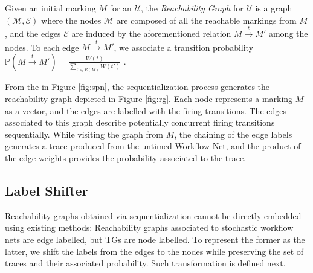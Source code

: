 \begin{definition}
	Given an initial marking $M$ for an \uswn $\mathcal{U}$,  the \textit{Reachability Graph} for $\mathcal{U}$ is a graph
	$(\mathcal{M},\mathcal{E})$ where the nodes  $\mathcal{M}$ are composed of all the reachable markings from $M$,
	and the edges $\mathcal{E}$ are induced by the aforementioned relation $M\overset{t}{\to}M'$ among the
	nodes. To each edge $M\overset{t}{\to}M'$, we associate a transition probability $\mathbb{P}\left(M\overset{t}{\to}M'\right)=\frac{W(t)}{\sum_{t'\in E(M)}W(t')}$ \cite{spdwe}.
\end{definition}

\begin{example}
From the \uswn in Figure \ref{fig:spn}, the sequentialization process generates the reachability graph depicted in
Figure \ref{fig:rg}. Each node represents a marking $M$ as a vector, and the edges are labelled with the firing transitions.
The edges associated to this graph describe potentially concurrent firing transitions sequentially. While visiting the graph from
$M$, the chaining of the edge labels generates a trace produced from the untimed Workflow Net, and the product of the edge
weights provides the probability associated to the trace.
\end{example}



\subsection{Label Shifter}\label{sec:LSift}
Reachability graphs obtained via sequentialization cannot be directly embedded using existing methods:  Reachability graphs
associated to stochastic workflow nets are edge labelled, but TGs are node labelled. To represent the former as the latter, we
shift the labels from the edges to the nodes  while preserving the set of traces and their associated probability.
Such transformation is defined next.

